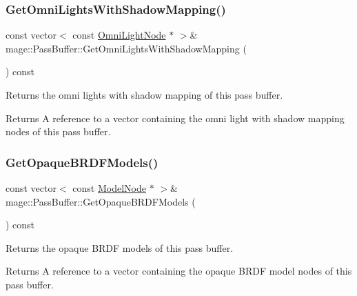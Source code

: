 \subsubsection{\texorpdfstring{Get\+Omni\+Lights\+With\+Shadow\+Mapping()}{GetOmniLightsWithShadowMapping()}}
{\footnotesize\ttfamily const vector$<$ const \hyperlink{namespacemage_a1724c6e6b6b5ba535cdd967cbbb4a669}{Omni\+Light\+Node} $\ast$ $>$\& mage\+::\+Pass\+Buffer\+::\+Get\+Omni\+Lights\+With\+Shadow\+Mapping (\begin{DoxyParamCaption}{ }\end{DoxyParamCaption}) const\hspace{0.3cm}{\ttfamily [noexcept]}}

Returns the omni lights with shadow mapping of this pass buffer.

\begin{DoxyReturn}{Returns}
A reference to a vector containing the omni light with shadow mapping nodes of this pass buffer. 
\end{DoxyReturn}
\hypertarget{structmage_1_1_pass_buffer_a75539c1d2349b864b54495c9757ada74}{}\label{structmage_1_1_pass_buffer_a75539c1d2349b864b54495c9757ada74} 
\subsubsection{\texorpdfstring{Get\+Opaque\+B\+R\+D\+F\+Models()}{GetOpaqueBRDFModels()}}
{\footnotesize\ttfamily const vector$<$ const \hyperlink{classmage_1_1_model_node}{Model\+Node} $\ast$ $>$\& mage\+::\+Pass\+Buffer\+::\+Get\+Opaque\+B\+R\+D\+F\+Models (\begin{DoxyParamCaption}{ }\end{DoxyParamCaption}) const\hspace{0.3cm}{\ttfamily [noexcept]}}

Returns the opaque B\+R\+DF models of this pass buffer.

\begin{DoxyReturn}{Returns}
A reference to a vector containing the opaque B\+R\+DF model nodes of this pass buffer. 
\end{DoxyReturn}
\hypertarget{structmage_1_1_pass_buffer_a1fcbb01cc67df0152046ceb2c9133b9a}{}\label{structmage_1_1_pass_buffer_a1fcbb01cc67df0152046ceb2c9133b9a} 
